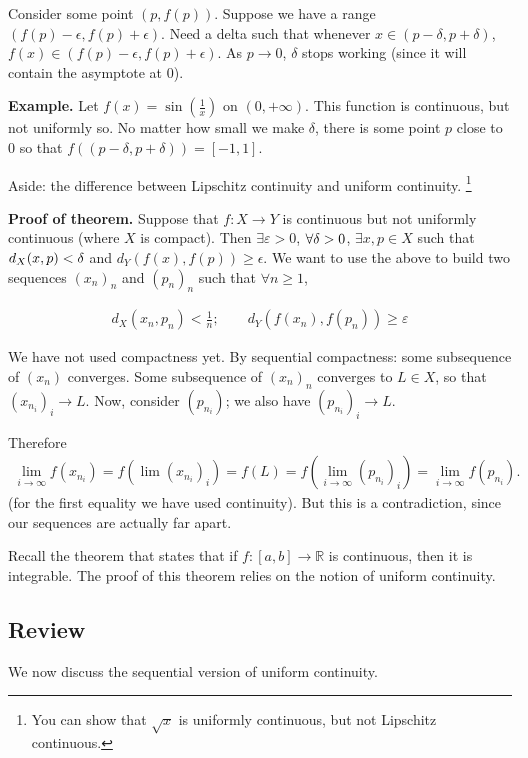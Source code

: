 \documentclass[12pt]{article}
\newcommand{\RR}{\mathbb{R}}
\newcommand{\eps}{\epsilon}
\begin{document}
Consider some point $(p, f(p))$.  Suppose we have a range $(f(p) - \eps, f(p) + \eps)$.  Need a delta such that whenever $x \in (p - \delta, p + \delta)$, $f(x) \in (f(p) - \eps, f(p) + \eps)$.  As $p \to 0$, $\delta$ stops working (since it will contain the asymptote at $0$).

{\bf Example.} Let $f(x) = \sin \left( \frac{1}{x} \right)$ on $(0, + \infty)$.  This function is continuous, but not uniformly so.  No matter how small we make $\delta$, there is some point $p$ close to 0 so that $f((p - \delta, p + \delta)) = [-1, 1]$.

Aside: the difference between Lipschitz continuity and uniform continuity. \footnote{You can show that $\sqrt{x}$ is uniformly continuous, but not Lipschitz continuous.}

{\bf Proof of theorem.} Suppose that $f: X \to Y$ is continuous but not uniformly continuous (where $X$ is compact).  Then $\exists \varepsilon > 0$, $\forall \delta > 0$, $\exists x, p \in X$ such that $d_{X}(x, p) < \delta$ and $d_{Y} (f(x), f(p)) \geq \eps$.  We want to use the above to build two sequences $(x_n)_n$ and $(p_n)_n$ such that $\forall n \geq 1$,

\begin{align*}
  d_X(x_n, p_n) < \frac{1}{n}; \qquad d_Y(f(x_n), f(p_n)) \geq \varepsilon
\end{align*}

We have not used compactness yet.  By sequential compactness: some subsequence of $(x_n)$ converges.  Some subsequence of $(x_n)_n$ converges to $L \in X$, so that $(x_{n_i})_i \to L$.  Now, consider $(p_{n_i})$; we also have $(p_{n_i})_i \to L$.

Therefore
\begin{align*}
  \lim_{i \to \infty} f(x_{n_i}) = f(\lim (x_{n_i})_i) = f(L) = f(\lim_{i \to \infty} (p_{n_i})_i) = \lim_{i \to \infty} f(p_{n_i}).
\end{align*}
(for the first equality we have used continuity).  But this is a contradiction, since our sequences are actually far apart.

Recall the theorem that states that if $f: [a, b] \to \RR$ is continuous, then it is integrable.  The proof of this theorem relies on the notion of uniform continuity.

\subsection{Review}

We now discuss the sequential version of uniform continuity. \\
\end{document}
